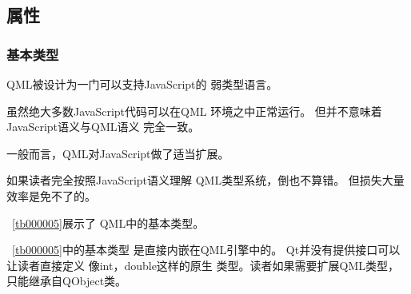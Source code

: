 ﻿




\FloatBarrier
\subsection{
属性
}\label{c000011s000000s01}



\FloatBarrier
\subsubsection{
基本类型
}\label{c000011s000000s01s01}


QML被设计为一门可以支持JavaScript的
弱类型语言。

虽然绝大多数JavaScript代码可以在QML
环境之中正常运行。
但并不意味着JavaScript语义与QML语义
完全一致。

一般而言，QML对JavaScript做了适当扩展。

如果读者完全按照JavaScript语义理解
QML类型系统，倒也不算错。
但损失大量效率是免不了的。

\tablename\ \ref{tb000005}展示了
QML中的基本类型。



\tablename\ \ref{tb000005}中的基本类型
是直接内嵌在QML引擎中的。
Qt并没有提供接口可以让读者直接定义
像int，double这样的原生
类型。读者如果需要扩展QML类型，只能继承自QObject类。




